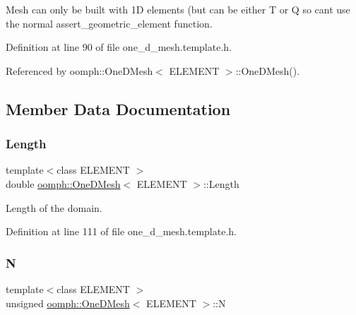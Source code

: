 Mesh can only be built with 1D elements (but can be either T or Q so can\textquotesingle{}t use the normal assert\+\_\+geometric\+\_\+element function. 

Definition at line 90 of file one\+\_\+d\+\_\+mesh.\+template.\+h.



Referenced by oomph\+::\+One\+D\+Mesh$<$ E\+L\+E\+M\+E\+N\+T $>$\+::\+One\+D\+Mesh().



\subsection{Member Data Documentation}
\mbox{\label{classoomph_1_1OneDMesh_a9c5ebabd7b2286b5f489563b1106e1b4}} 
\subsubsection{\texorpdfstring{Length}{Length}}
{\footnotesize\ttfamily template$<$class E\+L\+E\+M\+E\+NT $>$ \\
double \hyperlink{classoomph_1_1OneDMesh}{oomph\+::\+One\+D\+Mesh}$<$ E\+L\+E\+M\+E\+NT $>$\+::Length\hspace{0.3cm}{\ttfamily [protected]}}



Length of the domain. 



Definition at line 111 of file one\+\_\+d\+\_\+mesh.\+template.\+h.

\mbox{\label{classoomph_1_1OneDMesh_a6f6f4087d7dd7417c79f39f2c3a2865a}} 
\subsubsection{\texorpdfstring{N}{N}}
{\footnotesize\ttfamily template$<$class E\+L\+E\+M\+E\+NT $>$ \\
unsigned \hyperlink{classoomph_1_1OneDMesh}{oomph\+::\+One\+D\+Mesh}$<$ E\+L\+E\+M\+E\+NT $>$\+::N\hspace{0.3cm}{\ttfamily [protected]}}



